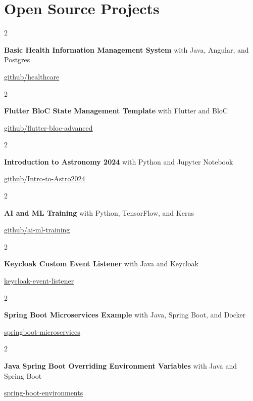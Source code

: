 \documentclass[10pt, letterpaper]{article}
\newenvironment{twocolentry}[2][]{
    \onecolentry
    \def\secondColumn{#2}
    \setcolumnwidth{\fill, 4.5 cm}
    \begin{paracol}{2}
}{
    \switchcolumn \raggedleft \secondColumn
    \end{paracol}
    \endonecolentry
} %
\begin{document}
    \section{Open Source Projects}
        \begin{twocolentry}{\href{https://github.com/cevheri/healthcare}{github/healthcare}}
            \textbf{Basic Health Information Management System} with Java, Angular, and Postgres
        \end{twocolentry}
        \vspace{0.10 cm}
        \begin{twocolentry}{\href{https://github.com/cevheri/flutter-bloc-advanced}{github/flutter-bloc-advanced}}
            \textbf{Flutter BloC State Management Template} with Flutter and BloC
        \end{twocolentry}
        \vspace{0.10 cm}
        \begin{twocolentry}{\href{https://github.com/cevheri/Intro-to-Astro2024}{github/Intro-to-Astro2024}}
            \textbf{Introduction to Astronomy 2024} with Python and Jupyter Notebook
        \end{twocolentry}
        \vspace{0.10 cm}
        \begin{twocolentry}{\href{https://github.com/cevheri/ai-ml-train}{github/ai-ml-training}}
            \textbf{AI and ML Training} with Python, TensorFlow, and Keras
        \end{twocolentry}
        \vspace{0.10 cm}
        \begin{twocolentry}{\href{https://github.com/cevheri/keycloak-custom-event-listener}{keycloak-event-listener}}
            \textbf{Keycloak Custom Event Listener} with Java and Keycloak
        \end{twocolentry}
        \vspace{0.10 cm}
        \begin{twocolentry}{\href{https://github.com/cevheri/springboot-microservices-example}{springboot-microservices}}
            \textbf{Spring Boot Microservices Example} with Java, Spring Boot, and Docker
        \end{twocolentry}
        \vspace{0.10 cm}
        \begin{twocolentry}{\href{https://github.com/cevheri/java-spring-boot-overriding-environment-variables}{spring-boot-environments}}
            \textbf{Java Spring Boot Overriding Environment Variables} with Java and Spring Boot
        \end{twocolentry}
\end{document}
